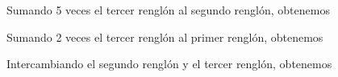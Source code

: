\begin{examplebox}{}{}
    \begin{matrizn}
    \end{matrizn}
    Sumando 5 veces el tercer renglón al segundo renglón, obtenemos
    \begin{matrizn}
    \end{matrizn}
    Sumando 2 veces el tercer renglón al primer renglón, obtenemos
    \begin{matrizn}
    \end{matrizn}
    Intercambiando el segundo renglón y el tercer renglón, obtenemos
    \begin{matrizn}

\end{matrizn}
\end{examplebox}
